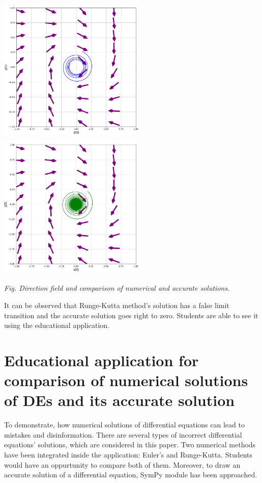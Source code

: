 \documentclass{article}
\begin{document}
\vspace{10mm}

\includegraphics[width=7cm, height=7cm]{runge_cycle.jpg}
\includegraphics[width=7cm, height=7cm]{green_cycle.jpg} 
\centerline{\textit{Fig. Direction field and comparison of numerical and accurate solutions.}}

\vspace{15mm}


It can be observed that Runge-Kutta method's solution has a false limit transition and the accurate solution goes right to zero. Students are able to see it using the educational application.








\section{Educational application for comparison of numerical solutions of DEs and its accurate solution}
To demonstrate, how numerical solutions of differential equations can lead to mistakes and disinformation. There are several types of incorrect differential equations' solutions, which are considered in this paper.
Two numerical methods have been integrated inside the application: Euler's and Runge-Kutta. Students would have an oppurtunity to compare both of them. Moreover, to draw an accurate solution of a differential equation, SymPy module has been approached.  
\end{document}
